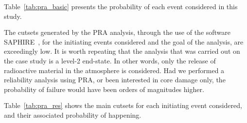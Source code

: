 Table~\ref{tab:pra_basic} presents the probability of each event considered in this study.

The cutsets generated by the PRA analysis, through the use of the software SAPHIRE~\cite{saphire}, for the initiating events considered and the goal of the analysis, are exceedingly low. It is worth repeating that the analysis that was carried out on the case study is a level-2 end-state. In other words, only the release of radioactive material in the atmosphere is considered. Had we performed a reliability analysis using PRA, or been interested in core damage only, the probability of failure would have been orders of magnitudes higher.

Table~\ref{tab:pra_res} shows the main cutsets for each initiating event considered, and their associated probability of happening.

